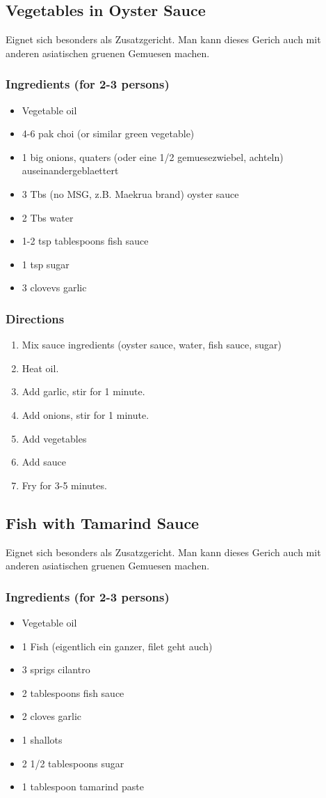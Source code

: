 \subsection{Vegetables in Oyster Sauce}
Eignet sich besonders als Zusatzgericht. Man kann dieses Gerich auch mit anderen asiatischen gruenen Gemuesen machen. 
\subsubsection*{Ingredients (for 2-3 persons)}
\begin{itemize}
\item[] Vegetable oil
\item[] 4-6 pak choi (or similar green vegetable)
\item[] 1 big onions, quaters (oder eine 1/2 gemuesezwiebel, achteln) auseinandergeblaettert
\item[] 3 Tbs (no MSG, z.B. Maekrua brand) oyster sauce 
\item[] 2 Tbs water
\item[] 1-2 tsp tablespoons fish sauce 
\item[] 1 tsp sugar
\item[] 3 clovevs garlic
\end{itemize}
\subsubsection*{Directions}
\begin{enumerate}
\item Mix sauce ingredients (oyster sauce, water, fish sauce, sugar)
\item Heat oil.
\item Add garlic, stir for 1 minute.
\item Add onions, stir for 1 minute.
\item Add vegetables
\item Add sauce
\item Fry for 3-5 minutes.
\end{enumerate}
\pagebreak


\subsection{Fish with Tamarind Sauce}
Eignet sich besonders als Zusatzgericht. Man kann dieses Gerich auch mit anderen asiatischen gruenen Gemuesen machen. 
\subsubsection*{Ingredients (for 2-3 persons)}
\begin{itemize}
\item[] Vegetable oil
\item[] 1 Fish (eigentlich ein ganzer, filet geht auch)
\item[] 3 sprigs cilantro 
\item[]  2 tablespoons fish sauce
\item[]  2 cloves garlic
\item[]  1 shallots
\item[]  2 1/2 tablespoons sugar
\item[]  1 tablespoon tamarind paste
\end{itemize}
